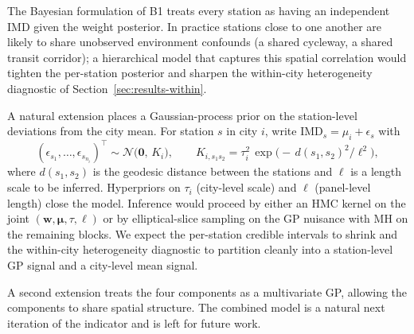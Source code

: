 \documentclass[11pt,a4paper]{article}
\newcommand{\IMD}{\mathrm{IMD}}
\begin{document}
The Bayesian formulation of B1 treats every station as having
an independent IMD given the weight posterior. In practice
stations close to one another are likely to share unobserved
environment confounds (a shared cycleway, a shared transit
corridor); a hierarchical model that captures this spatial
correlation would tighten the per-station posterior and
sharpen the within-city heterogeneity diagnostic of
Section~\ref{sec:results-within}.

A natural extension places a Gaussian-process prior on the
station-level deviations from the city mean. For station $s$
in city $i$, write
$\IMD_s = \mu_i + \epsilon_s$ with
\begin{equation}
(\epsilon_{s_1}, \ldots, \epsilon_{s_{n_i}})^{\top}
   \sim
   \mathcal{N}\bigl(\mathbf{0},\, K_i\bigr),
\qquad
K_{i, s_1 s_2}
   = \tau_i^{2}\,
     \exp\!\bigl(-\,d(s_1, s_2)^{2} / \ell^{2}\bigr),
\end{equation}
where $d(s_1, s_2)$ is the geodesic distance between the
stations and $\ell$ is a length scale to be inferred. Hyperpriors
on $\tau_i$ (city-level scale) and $\ell$ (panel-level length)
close the model. Inference would proceed by either an HMC kernel
on the joint $(\mathbf{w}, \boldsymbol{\mu}, \tau, \ell)$ or by
elliptical-slice sampling on the GP nuisance with MH on the
remaining blocks. We expect the per-station credible intervals
to shrink and the within-city heterogeneity diagnostic to
partition cleanly into a station-level GP signal and a
city-level mean signal.

A second extension treats the four components as a multivariate
GP, allowing the components to share spatial structure. The
combined model is a natural next iteration of the indicator and
is left for future work.


\end{document}
